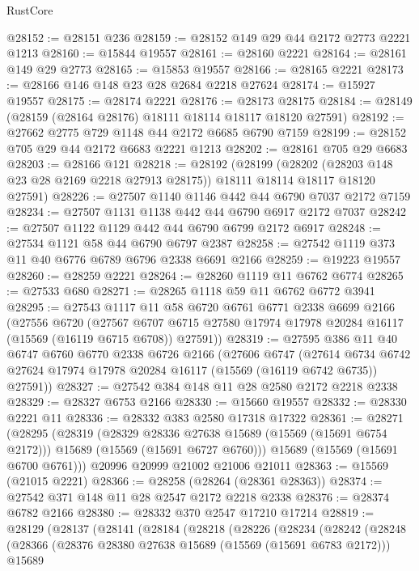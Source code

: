 \begin{lexlean}{RustCore}
\begin{coremodule}
@28152 := @28151 @236
@28159 := @28152 @149 @29 @44 @2172 @2773 @2221 @1213
@28160 := @15844 @19557
@28161 := @28160 @2221
@28164 := @28161 @149 @29 @2773
@28165 := @15853 @19557
@28166 := @28165 @2221
@28173 := @28166 @146 @148 @23 @28 @2684 @2218 @27624
@28174 := @15927 @19557
@28175 := @28174 @2221
@28176 := @28173 @28175
@28184 := @28149 (@28159 (@28164 @28176) @18111 @18114 @18117 @18120 @27591)
@28192 := @27662 @2775 @729 @1148 @44 @2172 @6685 @6790 @7159
@28199 := @28152 @705 @29 @44 @2172 @6683 @2221 @1213
@28202 := @28161 @705 @29 @6683
@28203 := @28166 @121
@28218 := @28192
    (@28199
      (@28202 (@28203 @148 @23 @28 @2169 @2218 @27913 @28175))
      @18111
      @18114
      @18117
      @18120
      @27591)
@28226 := @27507 @1140 @1146 @442 @44 @6790 @7037 @2172 @7159
@28234 := @27507 @1131 @1138 @442 @44 @6790 @6917 @2172 @7037
@28242 := @27507 @1122 @1129 @442 @44 @6790 @6799 @2172 @6917
@28248 := @27534 @1121 @58 @44 @6790 @6797 @2387
@28258 := @27542 @1119 @373 @11 @40 @6776 @6789 @6796 @2338 @6691 @2166
@28259 := @19223 @19557
@28260 := @28259 @2221
@28264 := @28260 @1119 @11 @6762 @6774
@28265 := @27533 @680
@28271 := @28265 @1118 @59 @11 @6762 @6772 @3941
@28295 := @27543
    @1117
    @11
    @58
    @6720
    @6761
    @6771
    @2338
    @6699
    @2166
    (@27556
      @6720
      (@27567 @6707 @6715 @27580 @17974 @17978 @20284 @16117 (@15569 (@16119 @6715 @6708)) @27591))
@28319 := @27595
    @386
    @11
    @40
    @6747
    @6760
    @6770
    @2338
    @6726
    @2166
    (@27606
      @6747
      (@27614 @6734 @6742 @27624 @17974 @17978 @20284 @16117 (@15569 (@16119 @6742 @6735)) @27591))
@28327 := @27542 @384 @148 @11 @28 @2580 @2172 @2218 @2338
@28329 := @28327 @6753 @2166
@28330 := @15660 @19557
@28332 := @28330 @2221 @11
@28336 := @28332 @383 @2580 @17318 @17322
@28361 := @28271
    (@28295
      (@28319
        (@28329 @28336 @27638 @15689 (@15569 (@15691 @6754 @2172)))
        @15689
        (@15569 (@15691 @6727 @6760)))
      @15689
      (@15569 (@15691 @6700 @6761)))
    @20996
    @20999
    @21002
    @21006
    @21011
@28363 := @15569 (@21015 @2221)
@28366 := @28258 (@28264 (@28361 @28363))
@28374 := @27542 @371 @148 @11 @28 @2547 @2172 @2218 @2338
@28376 := @28374 @6782 @2166
@28380 := @28332 @370 @2547 @17210 @17214
@28819 := @28129
    (@28137
      (@28141
        (@28184
          (@28218
            (@28226
              (@28234
                (@28242
                  (@28248
                    (@28366
                      (@28376 @28380 @27638 @15689 (@15569 (@15691 @6783 @2172)))
                      @15689

\end{coremodule}
\end{lexlean}
